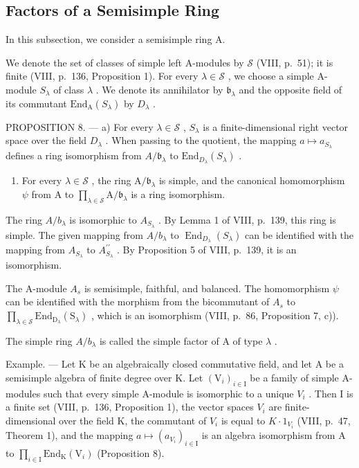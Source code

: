 \subsection{Factors of a Semisimple Ring}

In this subsection, we consider a semisimple ring A.

We denote the set of classes of simple left A-modules by \(\mathcal{S}\) (VIII, p.~51); it is finite (VIII, p.~136, Proposition 1). For every \(\lambda \in \mathcal{S}\) , we choose a simple A-module \(S_{\lambda}\) of class \(\lambda\) . We denote its annihilator by \(\mathfrak{b}_{\lambda}\) and the opposite field of its commutant \(\mathrm{End}_{\mathrm{A}}(S_{\lambda})\) by \(D_{\lambda}\) .

PROPOSITION 8. --- a) For every \(\lambda \in \mathcal{S}\) , \(S_{\lambda}\) is a finite-dimensional right vector space over the field \(D_{\lambda}\) . When passing to the quotient, the mapping \(a \mapsto a_{S_{\lambda}}\) defines a ring isomorphism from \(A / \mathfrak{b}_{\lambda}\) to \(\mathrm{End}_{D_{\lambda}}(S_{\lambda})\) .

\begin{enumerate}
\def\labelenumi{\alph{enumi})}
\setcounter{enumi}{1}
\tightlist
\item
  For every \(\lambda \in \mathcal{S}\) , the ring \(\mathrm{A} / \mathfrak{b}_{\lambda}\) is simple, and the canonical homomorphism \(\psi\) from \(\mathrm{A}\) to \(\prod_{\lambda \in \mathcal{S}}\mathrm{A} / \mathfrak{b}_{\lambda}\) is a ring isomorphism.
\end{enumerate}

The ring \(A/b_{\lambda}\) is isomorphic to \(A_{S_{\lambda}}\) . By Lemma 1 of VIII, p.~139, this ring is simple. The given mapping from \(A/b_{\lambda}\) to \(\operatorname{End}_{D_{\lambda}}(S_{\lambda})\) can be identified with the mapping from \(A_{S_{\lambda}}\) to \(A_{S_{\lambda}}^{\prime\prime}\) . By Proposition 5 of VIII, p.~139, it is an isomorphism.

The A-module \(A_{s}\) is semisimple, faithful, and balanced. The homomorphism \(\psi\) can be identified with the morphism from the bicommutant of \(A_{s}\) to \(\prod_{\lambda\in\mathcal{S}}\mathrm{End}_{\mathrm{D}_{\lambda}}(\mathrm{S}_{\lambda})\) , which is an isomorphism (VIII, p.~86, Proposition 7, c)).

The simple ring \(A/b_{\lambda}\) is called the simple factor of A of type \(\lambda\) .

Example. --- Let K be an algebraically closed commutative field, and let A be a semisimple algebra of finite degree over K. Let \((\mathrm{V}_{i})_{i\in\mathrm{I}}\) be a family of simple A-modules such that every simple A-module is isomorphic to a unique \(V_{i}\) . Then I is a finite set (VIII, p.~136, Proposition 1), the vector spaces \(V_{i}\) are finite-dimensional over the field K, the commutant of \(V_{i}\) is equal to \(K\cdot1_{V_{i}}\) (VIII, p.~47, Theorem 1), and the mapping \(a\mapsto(a_{V_{i}})_{i\in\mathrm{I}}\) is an algebra isomorphism from A to \(\prod_{i\in\mathrm{I}}\mathrm{End}_{\mathrm{K}}(\mathrm{V}_{i})\) (Proposition 8).

